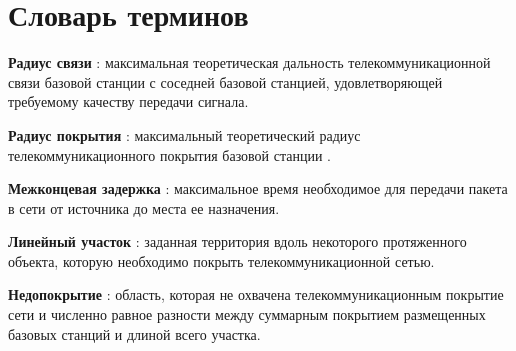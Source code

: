 \chapter*{Словарь терминов}             %


\textbf{Радиус связи} : максимальная теоретическая дальность телекоммуникационной связи базовой станции с соседней базовой станцией, удовлетворяющей требуемому качеству передачи сигнала.

\textbf{Радиус покрытия} : максимальный теоретический радиус телекоммуникационного покрытия базовой станции .

\textbf{Межконцевая задержка} : максимальное время необходимое для передачи пакета в сети от источника до места ее назначения.

\textbf{Линейный участок} : заданная территория вдоль некоторого протяженного объекта, которую необходимо покрыть телекоммуникационной сетью.

\textbf{Недопокрытие} : область, которая не охвачена телекоммуникационным покрытие сети и численно равное разности между суммарным покрытием размещенных базовых станций и длиной всего участка.